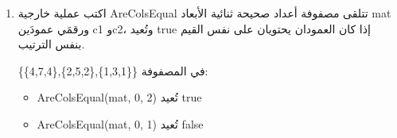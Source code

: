 \documentclass[14pt]{extarticle}
\begin{document}
\begin{enumerate}[itemsep=2em]
\begin{boxExample}
\textenglish{CountRowsAbove(mat, 20)}:
\begin{itemize}[itemsep=1pt]
    \item مجموع الصف 0: $3+7-2+5+1=14$ — لا
    \item مجموع الصف 1: $6+4+8+2+10=30$ — نعم
    \item مجموع الصف 2: $-1+9+0+3-4=7$ — لا
    \item مجموع الصف 3: $5+2+6+11+3=27$ — نعم
\end{itemize}
النتيجة: \textenglish{2}
\end{boxExample}

\ifwithsols
\begin{boxSolution}
\begin{boxCode}
\begin{english}
\begin{verbatim}
public static int CountRowsAbove(int[,] mat, int threshold)
{
    int count = 0;
    for (int i = 0; i < mat.GetLength(0); i++)
    {
        int sum = 0;
        for (int j = 0; j < mat.GetLength(1); j++)
            sum += mat[i, j];
        if (sum > threshold)
            count++;
    }
    return count;
}
\end{verbatim}
\end{english}
\end{boxCode}
\textbf{الشرح:} في كل دورة \textenglish{i} نحسب مجموع الصف الحالي بحلقة داخلية، ثم نفحص هل يتجاوز \textenglish{threshold}.
\end{boxSolution}
\clearpage
\fi

\item
اكتب عملية خارجية \textenglish{AreColsEqual} تتلقى مصفوفة أعداد صحيحة ثنائية الأبعاد \textenglish{mat} ورقمَي عمودَين \textenglish{c1} و\textenglish{c2}، وتُعيد \textenglish{true} إذا كان العمودان يحتويان على نفس القيم بنفس الترتيب.

\begin{boxExample}
في المصفوفة \textenglish{\{\{1,3,1\},\{2,5,2\},\{4,7,4\}\}}:
\begin{itemize}[itemsep=1pt]
    \item \textenglish{AreColsEqual(mat, 0, 2)} تُعيد \textenglish{true}
    \item \textenglish{AreColsEqual(mat, 0, 1)} تُعيد \textenglish{false}
\end{itemize}
\end{boxExample}


\end{enumerate}
\end{document}
